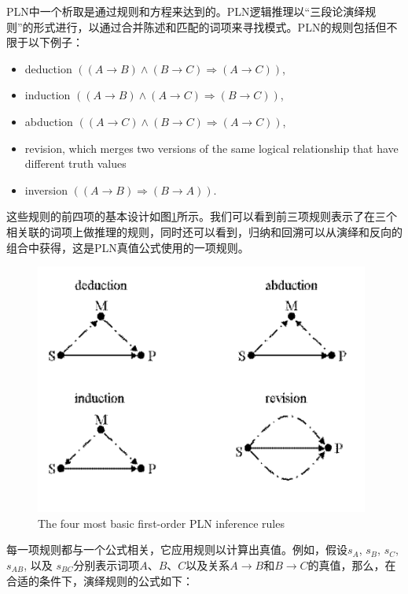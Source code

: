 PLN中一个析取是通过规则和方程来达到的。PLN逻辑推理以“三段论演绎规则”的形式进行，以通过合并陈述和匹配的词项来寻找模式。PLN的规则包括但不限于以下例子：

\begin{itemize}
\item deduction $\left((A\rightarrow B) \wedge (B\rightarrow C) \Rightarrow (A\rightarrow C)\right)$,
\item induction $\left((A\rightarrow B) \wedge (A\rightarrow C) \Rightarrow
(B\rightarrow C)\right)$,
\item abduction $\left((A\rightarrow C) \wedge (B\rightarrow C) \Rightarrow
(A\rightarrow C)\right)$,
  \item revision, which merges two versions of the same logical relationship that have different truth values
\item inversion $\left((A\rightarrow B) \Rightarrow
  (B\rightarrow A)\right)$.
\end{itemize}

这些规则的前四项的基本设计如图\ref{fig:inference}所示。我们可以看到前三项规则表示了在三个相关联的词项上做推理的规则，同时还可以看到，归纳和回溯可以从演绎和反向的组合中获得，这是PLN真值公式使用的一项规则。

\begin{figure}[htb]
  \center
  \includegraphics[width=11cm]{figures/inference.png}
  \caption{The four most basic first-order PLN inference rules}
  \label{fig:inference}
\end{figure}

每一项规则都与一个公式相关，它应用规则以计算出真值。例如，假设$s_A$, $s_B$, $s_C$, $s_{AB}$, 以及 $s_{BC}$分别表示词项$A$、$B$、$C$以及关系$A\rightarrow B$和$B\rightarrow C$的真值，那么，在合适的条件下，演绎规则的公式如下：

